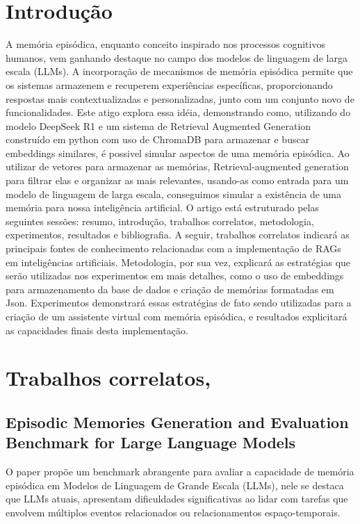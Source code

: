 \documentclass[conference]{IEEEtran}
\begin{document}
\section{Introdução}
A memória episódica, enquanto conceito inspirado nos processos cognitivos humanos, vem ganhando destaque no campo dos modelos de linguagem de larga escala (LLMs). A incorporação de mecanismos de memória episódica permite que os sistemas armazenem e recuperem experiências específicas, proporcionando respostas mais contextualizadas e personalizadas, junto com um conjunto novo de funcionalidades. Este atigo explora essa idéia, demonstrando como, utilizando do modelo DeepSeek R1 e um sistema de Retrieval Augmented Generation construído em python com uso de ChromaDB para armazenar e buscar embeddings similares, é possivel simular aspectos de uma memória episódica. Ao utilizar de vetores para armazenar as memórias, Retrieval-augmented generation para filtrar elas e organizar as mais relevantes, usando-as como entrada para um modelo de linguagem de larga escala, conseguimos simular a existência de uma memória para nossa inteligência artificial.
O artigo está estruturado pelas seguintes sessões: resumo, introdução, trabalhos correlatos, metodologia, experimentos, resultados e bibliografia. A seguir, trabalhos correlatos indicará as principais fontes de conhecimento relacionadas com a implementação de RAGs em inteligências artificiais. Metodologia, por sua vez, explicará as estratégias que serão utilizadas nos experimentos em mais detalhes, como o uso de embeddings para armazenamento da base de dados e criação de memórias formatadas em Json. Experimentos demonstrará essas estratégias de fato sendo utilizadas para a criação de um assistente virtual com memória episódica, e resultados explicitará as capacidades finais desta implementação.

\section{Trabalhos correlatos,}

\subsection{Episodic Memories Generation and Evaluation Benchmark for Large Language Models}
O paper propõe um benchmark abrangente para avaliar a capacidade de memória episódica em Modelos de Linguagem de Grande Escala (LLMs), nele se destaca que LLMs atuais, apresentam dificuldades significativas ao lidar com tarefas que envolvem múltiplos eventos relacionados ou relacionamentos espaço-temporais.
\end{document}

